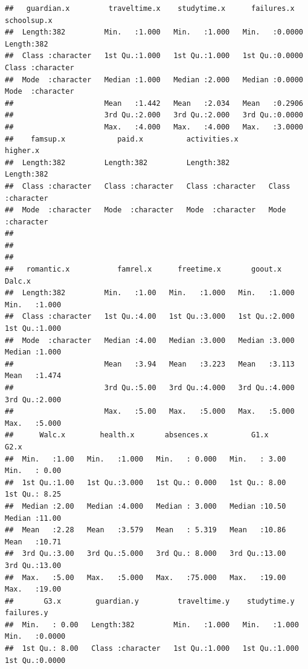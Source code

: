 \documentclass{article}\usepackage[]{graphicx}\usepackage[]{xcolor}
\makeatletter
\newenvironment{kframe}{%
 \def\at@end@of@kframe{}%
 \ifinner\ifhmode%
  \def\at@end@of@kframe{\end{minipage}}%
  \begin{minipage}{\columnwidth}%
 \fi\fi%
 \def\FrameCommand##1{\hskip\@totalleftmargin \hskip-\fboxsep
 \colorbox{shadecolor}{##1}\hskip-\fboxsep
     \hskip-\linewidth \hskip-\@totalleftmargin \hskip\columnwidth}%
 \MakeFramed {\advance\hsize-\width
   \@totalleftmargin\z@ \linewidth\hsize
   \@setminipage}}%
 {\par\unskip\endMakeFramed%
 \at@end@of@kframe}
\newenvironment{knitrout}{}{} %
\makeatother
\begin{document}
\begin{knitrout}
\begin{kframe}
\begin{verbatim}
##   guardian.x         traveltime.x    studytime.x      failures.x     schoolsup.x       
##  Length:382         Min.   :1.000   Min.   :1.000   Min.   :0.0000   Length:382        
##  Class :character   1st Qu.:1.000   1st Qu.:1.000   1st Qu.:0.0000   Class :character  
##  Mode  :character   Median :1.000   Median :2.000   Median :0.0000   Mode  :character  
##                     Mean   :1.442   Mean   :2.034   Mean   :0.2906                     
##                     3rd Qu.:2.000   3rd Qu.:2.000   3rd Qu.:0.0000                     
##                     Max.   :4.000   Max.   :4.000   Max.   :3.0000                     
##    famsup.x            paid.x          activities.x         higher.x        
##  Length:382         Length:382         Length:382         Length:382        
##  Class :character   Class :character   Class :character   Class :character  
##  Mode  :character   Mode  :character   Mode  :character   Mode  :character  
##                                                                             
##                                                                             
##                                                                             
##   romantic.x           famrel.x      freetime.x       goout.x          Dalc.x     
##  Length:382         Min.   :1.00   Min.   :1.000   Min.   :1.000   Min.   :1.000  
##  Class :character   1st Qu.:4.00   1st Qu.:3.000   1st Qu.:2.000   1st Qu.:1.000  
##  Mode  :character   Median :4.00   Median :3.000   Median :3.000   Median :1.000  
##                     Mean   :3.94   Mean   :3.223   Mean   :3.113   Mean   :1.474  
##                     3rd Qu.:5.00   3rd Qu.:4.000   3rd Qu.:4.000   3rd Qu.:2.000  
##                     Max.   :5.00   Max.   :5.000   Max.   :5.000   Max.   :5.000  
##      Walc.x        health.x       absences.x          G1.x            G2.x      
##  Min.   :1.00   Min.   :1.000   Min.   : 0.000   Min.   : 3.00   Min.   : 0.00  
##  1st Qu.:1.00   1st Qu.:3.000   1st Qu.: 0.000   1st Qu.: 8.00   1st Qu.: 8.25  
##  Median :2.00   Median :4.000   Median : 3.000   Median :10.50   Median :11.00  
##  Mean   :2.28   Mean   :3.579   Mean   : 5.319   Mean   :10.86   Mean   :10.71  
##  3rd Qu.:3.00   3rd Qu.:5.000   3rd Qu.: 8.000   3rd Qu.:13.00   3rd Qu.:13.00  
##  Max.   :5.00   Max.   :5.000   Max.   :75.000   Max.   :19.00   Max.   :19.00  
##       G3.x        guardian.y         traveltime.y    studytime.y      failures.y    
##  Min.   : 0.00   Length:382         Min.   :1.000   Min.   :1.000   Min.   :0.0000  
##  1st Qu.: 8.00   Class :character   1st Qu.:1.000   1st Qu.:1.000   1st Qu.:0.0000  

\end{verbatim}
\end{kframe}
\end{knitrout}
\end{document}
